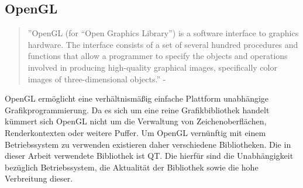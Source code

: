 \subsection{OpenGL}
\begin{quote}
	''OpenGL (for “Open Graphics Library”) is a software interface to graphics hardware.
	The interface consists of a set of several hundred procedures and functions
	that allow a programmer to specify the objects and operations involved in producing
	high-quality graphical images, specifically color images of three-dimensional
	objects.'' - \citep{OpenGLDoku}
\end{quote}
OpenGL ermöglicht eine verhältnismäßig einfache Plattform unabhängige Grafikprogrammierung. Da es sich um eine reine Grafikbibliothek handelt kümmert sich OpenGL nicht um die Verwaltung von Zeichenoberflächen, Renderkontexten oder weitere Puffer. Um OpenGL vernünftig mit einem Betriebssystem zu verwenden existieren daher verschiedene Bibliotheken. Die in dieser Arbeit verwendete Bibliothek ist QT. Die hierfür sind die Unabhängigkeit bezüglich Betriebssystem, die Aktualität der Bibliothek sowie die hohe Verbreitung dieser.